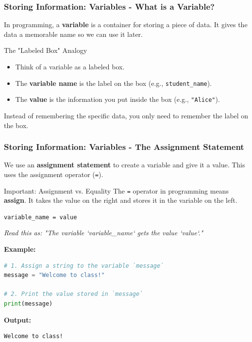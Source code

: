 \documentclass{beamer}
\begin{document}
\begin{frame}[fragile]
    \frametitle{Storing Information: Variables - What is a Variable?}
    
    In programming, a \textbf{variable} is a container for storing a piece of data. It gives the data a memorable name so we can use it later.
    
    \vspace{1em}
    
    \begin{block}{The "Labeled Box" Analogy}
        \begin{itemize}
            \item Think of a variable as a labeled box.
            \item The \textbf{variable name} is the label on the box (e.g., \texttt{student\_name}).
            \item The \textbf{value} is the information you put inside the box (e.g., \texttt{"Alice"}).
        \end{itemize}
    \end{block}
    
    \vspace{1em}
    
    \centering
    Instead of remembering the specific data, you only need to remember the label on the box.
    
\end{frame}

\begin{frame}[fragile]
    \frametitle{Storing Information: Variables - The Assignment Statement}
    
    We use an \textbf{assignment statement} to create a variable and give it a value. This uses the assignment operator (\texttt{=}).
    
    \vspace{1em}
    
    \begin{block}{Important: Assignment vs. Equality}
        The \texttt{=} operator in programming means \textbf{assign}. It takes the value on the right and stores it in the variable on the left.
        \begin{center}
        \texttt{variable\_name = value}
        \end{center}
        \textit{Read this as: "The variable `variable_name` gets the value `value`."}
    \end{block}
    
    \textbf{Example:}
    \begin{lstlisting}[language=Python]
# 1. Assign a string to the variable `message`
message = "Welcome to class!"

# 2. Print the value stored in `message`
print(message)
    \end{lstlisting}
    
    \textbf{Output:}
    \begin{lstlisting}
Welcome to class!
    \end{lstlisting}
    
\end{frame}
\end{document}
